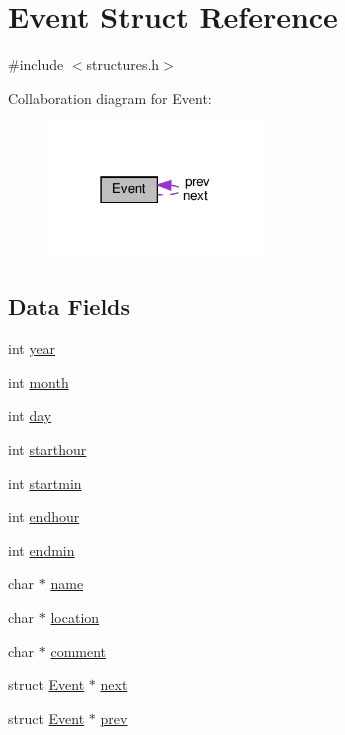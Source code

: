 \hypertarget{struct_event}{}\section{Event Struct Reference}
\label{struct_event}


{\ttfamily \#include $<$structures.\+h$>$}



Collaboration diagram for Event\+:\nopagebreak
\begin{figure}[H]
\begin{center}
\leavevmode
\includegraphics[width=162pt]{struct_event__coll__graph}
\end{center}
\end{figure}
\subsection*{Data Fields}
\begin{DoxyCompactItemize}
\item 
int \hyperlink{struct_event_abeac221e38b7b9ce7df8722c842bf671}{year}
\item 
int \hyperlink{struct_event_aedb06abe5aff12fa3e7e0e71a374edfb}{month}
\item 
int \hyperlink{struct_event_a4c11afc03fc3ee49bab660def6558f2a}{day}
\item 
int \hyperlink{struct_event_ad40616cbc61c79a6caf6c8c2464bab8d}{starthour}
\item 
int \hyperlink{struct_event_a6a7bf86ae11349bf260da9abce25452a}{startmin}
\item 
int \hyperlink{struct_event_a23ec0f5427aad3f169339f21523d2041}{endhour}
\item 
int \hyperlink{struct_event_ac9b41151b48114ff949e78b68a81572b}{endmin}
\item 
char $\ast$ \hyperlink{struct_event_a5ac083a645d964373f022d03df4849c8}{name}
\item 
char $\ast$ \hyperlink{struct_event_a6a0d5603410d5eda93c0ff341966cce1}{location}
\item 
char $\ast$ \hyperlink{struct_event_a25dae25c3bf9b28d54eb4df7afb2a491}{comment}
\item 
struct \hyperlink{struct_event}{Event} $\ast$ \hyperlink{struct_event_a306f86f79bc8a24df2ff2989f10ea5b8}{next}
\item 
struct \hyperlink{struct_event}{Event} $\ast$ \hyperlink{struct_event_a587efee11d7ca5779c56b343342c65f9}{prev}
\end{DoxyCompactItemize}


